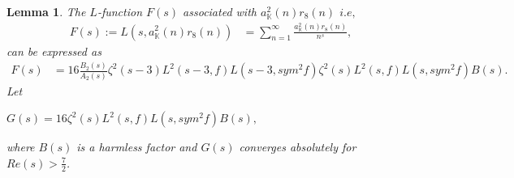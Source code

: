 \documentclass[preprint,12pt]{elsarticle}
\newtheorem{lemma}{Lemma}[section]
\numberwithin{equation}{section}
\begin{document}
\begin{lemma} The $L$-function $F(s)$ associated with $a_{\mathbb{K}}^{2}(n)r_{8}(n)$ $i.e,$
	\begin{align*}
		F(s):=L(s, a_{\mathbb{K}}^{2}(n)r_{8}(n))&=\sum_{n=1}^{\infty}\frac{a_{\mathbb{K}}^{2}(n)r_{8}(n)}{n^{s}},
	\end{align*}
	can be expressed as
	\begin{align*}
		F(s)&=16\frac{B_{2}(s)}{A_{2}(s)}\zeta^{2}(s-3)L^{2}(s-3,f)L(s-3,sym^{2}f)\zeta^{2}(s)L^{2}(s,f)L(s,sym^{2}f)B(s).
	\end{align*}
	Let 
	\begin{center}
		$G(s)=16\zeta^{2}(s)L^{2}(s,f)L(s,sym^{2}f)B(s),$
	\end{center}
	where $B(s)$ is a harmless factor and $G(s)$ converges absolutely for $Re(s)>\frac{7}{2}$.
\end{lemma}
\end{document}
